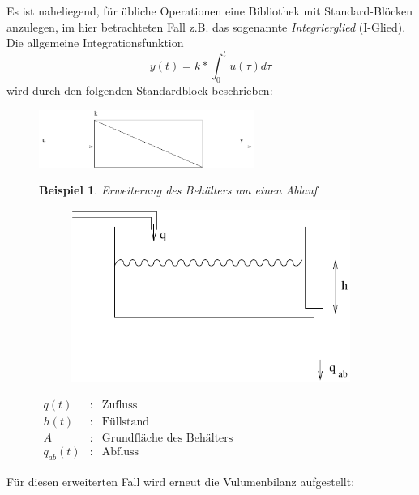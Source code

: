 \documentclass[12pt,a4paper,ngerman]{scrartcl}
\newtheorem{bsp}{Beispiel}[section] %
\begin{document}
Es ist naheliegend, für übliche Operationen eine Bibliothek mit Standard-Blöcken anzulegen, im hier betrachteten Fall z.B. das sogenannte \emph{Integrierglied} (I-Glied).
Die allgemeine Integrationsfunktion
\begin{equation*}
  y(t)=k*\int_0^t{u(\tau)d\tau}
\end{equation*}
wird durch den folgenden Standardblock beschrieben:
\begin{figure}[H]
  \includegraphics[width=7cm]{sysregel_iglied}
\end{figure}
\begin{figure}[H]
\begin{bsp}
Erweiterung des Behälters um einen Ablauf
\end{bsp}

\begin{minipage}{0.4\linewidth}
\begin{figure}[H]
  \includegraphics[width=.9\linewidth]{sysregel_bsp_2}  
\end{figure}
\end{minipage}
\begin{minipage}{0.6\linewidth}
$\begin{array}{lll}
q(t)&:&\text{Zufluss}\\
h(t)&:&\text{Füllstand}\\
A&:&\text{Grundfläche des Behälters}\\
q_{ab}(t)&:&\text{Abfluss}
\end{array}$
\end{minipage}
\end{figure}
Für diesen erweiterten Fall wird erneut die Vulumenbilanz aufgestellt:
\end{document}
